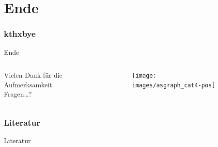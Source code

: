 \documentclass[ngerman,compress,hyperref={bookmarks}]{beamer}
\begin{document}
\part{Ende}
\section{kthxbye}
\begin{frame}[plain]{Ende}
\begin{columns}[t]
\begin{column}{0.5\textwidth}
 \begin{center}
 \vspace{1cm}
 Vielen Dank für die Aufmerksamkeit\\
 \vspace{1.5cm}
 Fragen\ldots?
 \end{center}
\end{column}
\begin{column}{0.5\textwidth}
 \vspace{-1cm}
 \begin{figure}
  \label{asngraphs2}
  \texttt{[image: images/asgraph\_cat4-pos]}
 \end{figure}
\end{column}
\end{columns}
\end{frame}

\section{Literatur}
\begin{frame}{Literatur}
\scriptsize


\end{frame}
\end{document}
